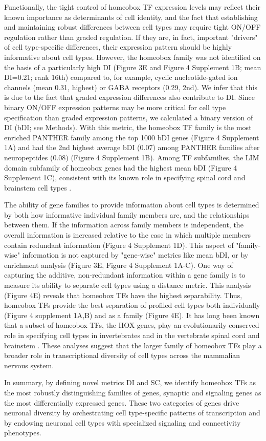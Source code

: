 Functionally, the tight control of homeobox TF expression levels may reflect their known importance as determinants of cell identity, and the fact that establishing and maintaining robust differences between cell types may require tight ON/OFF regulation rather than graded regulation. If they are, in fact, important "drivers" of cell type-specific differences, their expression pattern should be highly informative about cell types. However, the homeobox family was not identified on the basis of a particularly high DI (Figure 3E and Figure 4 Supplement 1B; mean DI=0.21; rank 16th) compared to, for example, cyclic nucleotide-gated ion channels (mean 0.31, highest) or GABA receptors (0.29, 2nd). We infer that this is due to the fact that graded expression differences also contribute to DI. Since binary ON/OFF expression patterns may be more critical for cell type specification than graded expression patterns, we calculated a binary version of DI (bDI; see Methods). With this metric, the homeobox TF family is the most enriched PANTHER family among the top 1000 bDI genes (Figure 4 Supplement 1A) and had the 2nd highest average bDI (0.07) among PANTHER families after neuropeptides (0.08) (Figure 4 Supplement 1B). Among TF subfamilies, the LIM domain subfamily of homeobox genes had the highest mean bDI (Figure 4 Supplement 1C), consistent with its known role in specifying spinal cord and brainstem cell types \citep{Dasen_2009,Philippidou_2013}. 

The ability of gene families to provide information about cell types is determined by both how informative individual family members are, and the relationships between them. If the information across family members is independent, the overall information is increased relative to the case in which multiple members contain redundant information (Figure 4 Supplement 1D). This aspect of "family-wise" information is not captured by "gene-wise" metrics like mean bDI, or by enrichment analysis (Figure 3E, Figure 4 Supplement 1A-C). One way of capturing the additive, non-redundant information within a gene family is to measure its ability to separate cell types using a distance metric. This analysis (Figure 4E) reveals that homeobox TFs have the highest separability. Thus, homeobox TFs provide the best separation of profiled cell types both individually (Figure 4 supplement 1A,B) and as a family (Figure 4E). It has long been known that a subset of homeobox TFs, the HOX genes, play an evolutionarily conserved role in specifying cell types in invertebrates \citep{Kratsios_2017,Zheng_2015} and in the vertebrate spinal cord and brainstem \citep{Dasen_2009,Philippidou_2013}. These analyses suggest that the larger family of homeobox TFs play a broader role in transcriptional diversity of cell types across the mammalian nervous system.

In summary, by defining novel metrics DI and SC, we identify homeobox TFs as the most robustly distinguishing families of genes, synaptic and signaling genes as the most differentially expressed genes. These two categories of genes drive neuronal diversity by orchestrating cell type-specific patterns of transcription and by endowing neuronal cell types with specialized signaling and connectivity phenotypes.



